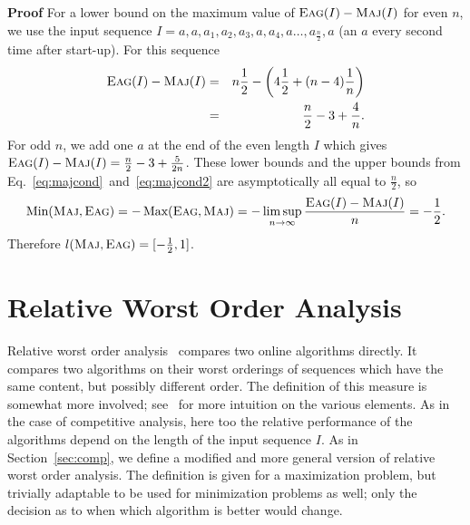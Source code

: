 \documentclass[11pt]{article}
\newenvironment{proof}{\begin{trivlist}\item[]{\bf Proof }}{\hspace*{\fill}\raisebox{-1pt}{\boldmath$\Box$}\end{trivlist}}
\newcommand{\maj}{{\ensuremath{\textsc{Maj}}}\xspace}
\newcommand{\eag}{{\ensuremath{\textsc{Eag}}}\xspace}
\DeclareMathOperator{\Max}{\textrm{Max}}
\DeclareMathOperator{\Min}{\textrm{Min}}
\begin{document}
\begin{proof}
For a lower bound on the maximum value of $\eag(I) - \maj(I)$ for even $n$, we
use the input sequence $I =  a, a, a_1, a_2, a_3, a, a_4,a \ldots, a_{\frac{n}{2}}, a$ (an $a$ every second time after start-up).
For this sequence
\begin{eqnarray}
\eag(I) - \maj(I) &=& n\frac{1}{2} - \left( 4\frac{1}{2} + (n-4)\frac{1}{n}\right) \nonumber
\\
&=& \frac{n}{2} -3 + \frac{4}{n}.   \nonumber
\end{eqnarray}
For odd $n$, we add one $a$ at the end of the even length $I$ which gives $\eag(I) - \maj(I) = \frac{n}{2} -3 + \frac{5}{2n}$.
These lower bounds and the upper bounds from Eq.~\ref{eq:majcond}~and~\ref{eq:majcond2} are asymptotically all equal to $\frac{n}{2}$, so
\begin{equation}
\Min(\maj, \eag) = -\Max(\eag, \maj) = -\limsup _{n\to \infty} \frac{\eag (I) - \maj (I)}{n} = -\frac{1}{2}.\nonumber
\end{equation}
Therefore $l(\maj, \eag) = [-\frac{1}{2}, 1]$.


\end{proof}


\section{Relative Worst Order Analysis}\label{sec:rel_worst}

Relative worst order analysis~\cite{Boyar07} compares two online algorithms directly.
It compares two algorithms on their worst orderings of sequences which have the same content, but possibly different order.
The definition of this measure is somewhat more involved; see~\cite{BFL07j}
for more intuition on the various elements.
As in the case of competitive analysis, here too the relative performance of the algorithms depend on the length of the input sequence $I$.
As in Section~\ref{sec:comp}, we define a modified and more general version of relative worst order analysis. The definition is given for a maximization
problem, but trivially adaptable to be used for minimization problems as well;
only the decision as to when which algorithm is better would change.
\end{document}

